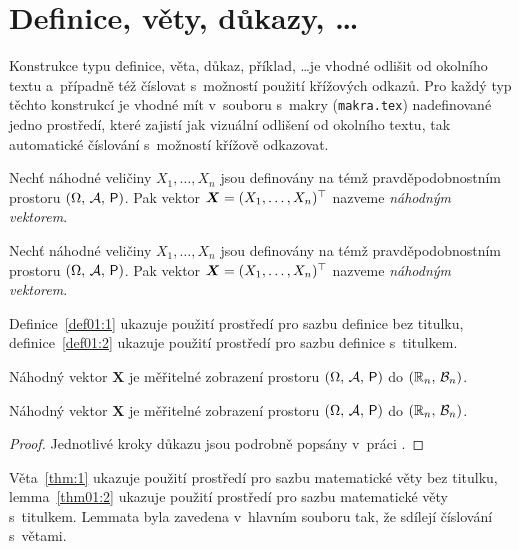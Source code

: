 \section{Definice, věty, důkazy, \dots}

Konstrukce typu definice, věta, důkaz, příklad, \dots je vhodné
odlišit od okolního textu a~případně též číslovat s~možností použití
křížových odkazů. Pro každý typ těchto konstrukcí je vhodné mít
v~souboru s~makry (\texttt{makra.tex}) nadefinované jedno prostředí,
které zajistí jak vizuální odlišení od okolního textu, tak
automatické číslování s~možností křížově odkazovat.

\begin{defn}\label{def01:1}
  Nechť náhodné veličiny $X_1,\dots,X_n$ jsou definovány na témž
  prav\-dě\-po\-dob\-nost\-ním prostoru $(\Omega,\,\mathcal{A},\,\operatorname{\textsf{P}})$. Pak
  vektor $\bm X = (X_1,\dots,X_n)^\top$ nazveme \emph{náhodným
    vektorem}.
\end{defn}

\begin{defn}\label{def01:2}
  Nechť náhodné veličiny $X_1,\dots,X_n$ jsou definovány na témž
  pravděpodobnostním prostoru $(\Omega,\,\mathcal{A},\,\operatorname{\textsf{P}})$. Pak
  vektor $\bm X = (X_1,\dots,X_n)^\top$ nazveme \emph{náhodným
    vektorem}.
\end{defn}
Definice~\ref{def01:1} ukazuje použití prostředí pro sazbu definice
bez titulku, definice~\ref{def01:2} ukazuje použití prostředí pro
sazbu definice s~titulkem.

\begin{thm}\label{veta01:1}
  Náhodný vektor $\bm X$ je měřitelné zobrazení prostoru
  $(\Omega,\,\mathcal{A},\,\operatorname{\textsf{P}})$ do $(\mathbb{R}_n,\,\mathcal{B}_n)$.
\end{thm}

\begin{lemma}\label{veta01:2}
  Náhodný vektor $\bm X$ je měřitelné zobrazení prostoru
  $(\Omega,\,\mathcal{A},\,\operatorname{\textsf{P}})$ do $(\mathbb{R}_n,\,\mathcal{B}_n)$.
\end{lemma}
\begin{proof}
  Jednotlivé kroky důkazu jsou podrobně popsány v~práci \citet[str.
  29]{Andel07}.
\end{proof}
Věta~\ref{thm:1} ukazuje použití prostředí pro sazbu matematické
věty bez titulku, lemma~\ref{thm01:2} ukazuje použití prostředí pro
sazbu matematické věty s~titulkem. Lemmata byla zavedena v~hlavním
souboru tak, že sdílejí číslování s~větami.
